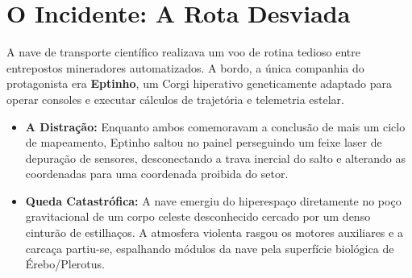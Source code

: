 \documentclass[a4paper,12pt]{report}
\begin{document}
\section{O Incidente: A Rota Desviada}
A nave de transporte científico realizava um voo de rotina tedioso entre entrepostos mineradores automatizados. A bordo, a única companhia do protagonista era \textbf{Eptinho}, um Corgi hiperativo geneticamente adaptado para operar consoles e executar cálculos de trajetória e telemetria estelar.
\begin{itemize}
    \item \textbf{A Distração:} Enquanto ambos comemoravam a conclusão de mais um ciclo de mapeamento, Eptinho saltou no painel perseguindo um feixe laser de depuração de sensores, desconectando a trava inercial do salto e alterando as coordenadas para uma coordenada proibida do setor.
    \item \textbf{Queda Catastrófica:} A nave emergiu do hiperespaço diretamente no poço gravitacional de um corpo celeste desconhecido cercado por um denso cinturão de estilhaços. A atmosfera violenta rasgou os motores auxiliares e a carcaça partiu-se, espalhando módulos da nave pela superfície biológica de Érebo/Plerotus.
\end{itemize}
\end{document}
